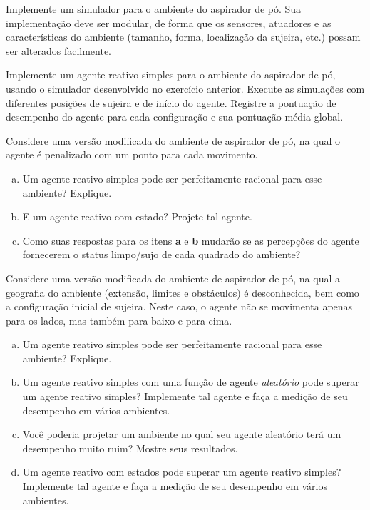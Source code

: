 \begin{exercise}
Implemente um simulador para o ambiente do aspirador de pó. Sua implementação deve ser modular, de forma que os sensores, atuadores e as características do ambiente (tamanho, forma, localização da sujeira, etc.) possam ser alterados facilmente.
\end{exercise}

\begin{exercise}
Implemente um agente reativo simples para o ambiente do aspirador de pó, usando o simulador desenvolvido no exercício anterior. Execute as simulações com diferentes posições de sujeira e de início do agente. Registre a pontuação de desempenho do agente para cada configuração e sua pontuação média global.
\end{exercise}

\begin{exercise}
Considere uma versão modificada do ambiente de aspirador de pó, na qual o agente é penalizado com um ponto para cada movimento.
\begin{enumerate}[a.]
	\item Um agente reativo simples pode ser perfeitamente racional para esse ambiente? Explique.
	\item E um agente reativo com estado? Projete tal agente.
	\item Como suas respostas para os itens \textbf{a} e \textbf{b} mudarão se as percepções do agente fornecerem o status limpo/sujo de cada quadrado do ambiente?
\end{enumerate}
\end{exercise}

\begin{exercise}
Considere uma versão modificada do ambiente de aspirador de pó, na qual a geografia do ambiente (extensão, limites e obstáculos) é desconhecida, bem como a configuração inicial de sujeira. Neste caso, o agente não se movimenta apenas para os lados, mas também para baixo e para cima.
\begin{enumerate}[a.]
	\item Um agente reativo simples pode ser perfeitamente racional para esse ambiente? Explique.
	\item Um agente reativo simples com uma função de agente \textit{aleatório} pode superar um agente reativo simples? Implemente tal agente e faça a medição de seu desempenho em vários ambientes.
	\item Você poderia projetar um ambiente no qual seu agente aleatório terá um desempenho muito ruim? Mostre seus resultados.
	\item Um agente reativo com estados pode superar um agente reativo simples? Implemente tal agente e faça a medição de seu desempenho em vários ambientes.
\end{enumerate}

\end{exercise}